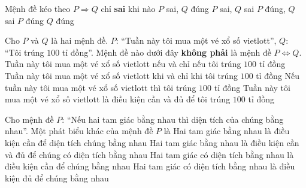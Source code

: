 \begin{ex}%
	Mệnh đề kéo theo $P \Rightarrow Q$ chỉ \textbf{sai} khi nào
	\choice
	{$P$ sai, $Q$ đúng}
	{$P$ sai, $Q$ sai}
	{\True $P$ đúng, $Q$ sai}
	{$P$ đúng $Q$ đúng}
\end{ex}

\begin{ex}%
	Cho $P$ và $Q$ là hai mệnh đề. $P$: ``Tuần này tôi mua một vé xổ số vietlott'', $Q$: 
	``Tôi trúng $100$ tỉ đồng''. Mệnh đề nào dưới đây \textbf{không phải} là mệnh đề $P \Leftrightarrow Q$. 
	\choice 
	{Tuần này tôi mua một vé xổ số vietlott nếu và chỉ nếu tôi trúng $100$ tỉ đồng}
	{Tuần này tôi mua một vé xổ số vietlott khi và chỉ khi tôi trúng $100$ tỉ đồng}
	{\True Nếu tuần này tôi mua một vé xổ số vietlott thì tôi trúng $100$ tỉ đồng}
	{Tuần này tôi mua một vé xổ số vietlott là điều kiện cần và đủ để tôi trúng $100$ tỉ đồng}
\end{ex}

\begin{ex}%
	Cho mệnh đề $P$: ``Nếu hai tam giác bằng nhau thì diện tích của chúng bằng nhau''. Một phát biểu khác của mệnh đề $P$ là
	\choice
	{Hai tam giác bằng nhau là điều kiện cần để diện tích chúng bằng nhau}
	{Hai tam giác bằng nhau là điều kiện cần và đủ để chúng có diện tích bằng nhau}
	{\True Hai tam giác có diện tích bằng nhau là điều kiện cần để chúng bằng nhau}
	{Hai tam giác có diện tích bằng nhau là điều kiện đủ để chúng bằng nhau}
\end{ex}



